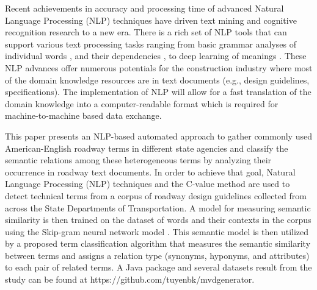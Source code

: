 \documentclass[Journal, BackFigs,NoLists, DoubleSpace]{ascelike}%
\begin{document}
\par
Recent achievements in accuracy and processing time of advanced Natural Language Processing (NLP) techniques have driven text mining and cognitive recognition research to a new era. There is a rich set of NLP tools that can support various text processing tasks ranging from basic grammar analyses of individual words \cite{Toutanova03,Cunningham02}, and their dependencies \cite{chen14}, to deep learning of meanings \cite{mikolov13a,pennington2014glove}. These NLP advances offer numerous potentials for the construction industry where most of the domain knowledge resources are in text documents (e.g., design guidelines, specifications). The implementation of NLP will allow for a fast translation of the domain knowledge into a computer-readable format which is required for machine-to-machine based data exchange.
\par
This paper presents an NLP-based automated approach to gather commonly used American-English roadway terms in different state agencies and classify the semantic relations among these heterogeneous terms by analyzing their occurrence in roadway text documents. In order to achieve that goal, Natural Language Processing (NLP) techniques and the C-value method \cite{frantzi20} are used to detect technical terms from a corpus of roadway design guidelines collected from across the State Departments of Transportation. A model for measuring semantic similarity is then trained on the dataset of words and their contexts in the corpus using the Skip-gram neural network model \cite{mikolov13a}. This semantic model is then utilized by a proposed term classification algorithm that measures the semantic similarity between terms and assigns a relation type (synonyms, hyponyms, and attributes) to each pair of related terms. A Java package and several datasets result from the study can be found at https://github.com/tuyenbk/mvdgenerator.
% 
\end{document}
